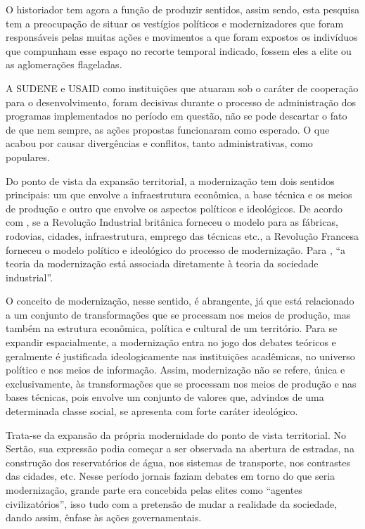 \begin{refsection}
    O historiador tem agora a função de produzir sentidos, assim sendo, esta pesquisa tem a preocupação de situar os vestígios políticos e modernizadores que foram responsáveis pelas muitas ações e movimentos a que foram expostos os indivíduos que compunham esse espaço no recorte temporal indicado, fossem eles a elite ou as aglomerações flageladas.

    A SUDENE e USAID como instituições que atuaram sob o caráter de cooperação para o desenvolvimento, foram decisivas durante o processo de administração dos programas implementados no período em questão, não se pode descartar o fato de que nem sempre, as ações propostas funcionaram como esperado. O que acabou por causar divergências e conflitos, tanto administrativas, como populares. 

    Do ponto de vista da expansão territorial, a modernização tem dois sentidos principais: um que envolve a infraestrutura econômica, a base técnica e os meios de produção e outro que envolve os aspectos políticos e ideológicos. De acordo com \textcite{Hobsbawm1996Revolucao}, se a Revolução Industrial britânica forneceu o modelo para as fábricas, rodovias, cidades, infraestrutura, emprego das técnicas etc., a Revolução Francesa forneceu o modelo político e ideológico do processo de modernização. Para \textcite[p.~111]{Giddens1984Teoria}, ``a teoria da modernização está associada diretamente à teoria da sociedade industrial''.  

    O conceito de modernização, nesse sentido, é abrangente, já que está relacionado a um conjunto de transformações que se processam nos meios de produção, mas também na estrutura econômica, política e cultural de um território. Para se expandir espacialmente, a modernização entra no jogo dos debates teóricos e geralmente é justificada ideologicamente nas instituições acadêmicas, no universo político e nos meios de informação. Assim, modernização não se refere, única e exclusivamente, às transformações que se processam nos meios de produção e nas bases técnicas, pois envolve um conjunto de valores que, advindos de uma determinada classe social, se apresenta com forte caráter ideológico. 

    Trata-se da expansão da própria modernidade do ponto de vista territorial. No Sertão, sua expressão podia começar a ser observada na abertura de estradas, na construção dos reservatórios de água, nos sistemas de transporte, nos contrastes das cidades, etc. Nesse período jornais faziam debates em torno do que seria modernização, grande parte era concebida pelas elites como ``agentes civilizatórios'', isso tudo com a pretensão de mudar a realidade da sociedade, dando assim, ênfase às ações governamentais. 


\end{refsection}
